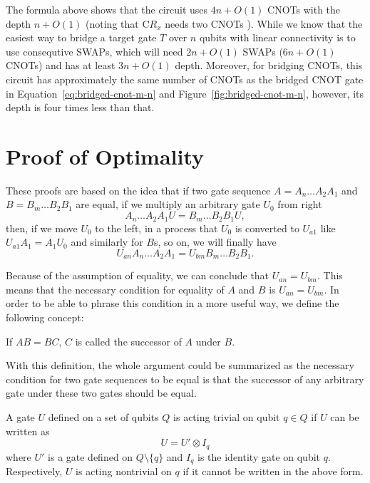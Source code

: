 The formula above shows that the circuit uses $4n + O(1)$ CNOTs with the depth $n + O(1)$ (noting that $\mathrm{C}R_x$ needs two CNOTs \cite[chapter 4]{nielsen2010}). While we know that the easiest way to bridge a target gate $T$ over $n$ qubits with linear connectivity is to use consequtive SWAPs, which will need $2n + O(1)$ SWAPs ($6n + O(1)$ CNOTs) and has at least $3n + O(1)$ depth. Moreover, for bridging CNOTs, this circuit has approximately the same number of CNOTs as the bridged CNOT gate in Equation~\ref{eq:bridged-cnot-m-n} and Figure~\ref{fig:bridged-cnot-m-n}, however, its depth is four times less than that.


\section{Proof of Optimality}

These proofs are based on the idea that if two gate sequence $A = A_n \dots A_2 A_1$ and $B = B_m \dots B_2 B_1$ are equal, if we multiply an arbitrary gate $U_{0}$ from right
\begin{equation}
  A_n \dots A_2 A_1 U = B_m \dots B_2 B_1 U,
\end{equation}
then, if we move $U_{0}$ to the left, in a process that $U_0$ is converted to $U_{a1}$ like $U_{a1} A_1 = A_1 U_{0}$ and similarly for $B$s, so on, we will finally have
\begin{equation}
  U_{an} A_n \dots A_2 A_1 = U_{bm} B_m \dots B_2 B_1.
\end{equation}

Because of the assumption of equality, we can conclude that $U_{an} = U_{bm}$. This means that the necessary condition for equality of $A$ and $B$ is $U_{an} = U_{bm}$. In order to be able to phrase this condition in a more useful way, we define the following concept:

\begin{definition}[Successor]
  If $AB = BC$, $C$ is called the successor of $A$ under $B$.
\end{definition}

With this definition, the whole argument could be summarized as the necessary condition for two gate sequences to be equal is that the successor of any arbitrary gate under these two gates should be equal.

\begin{definition}
  A gate $U$ defined on a set of qubits $Q$ is acting trivial on qubit $q \in Q$ if $U$ can be written as 
  \begin{equation}
    U = U' \otimes I_q
  \end{equation}
  where $U'$ is a gate defined on $Q \setminus \{ q \}$ and $I_q$ is the identity gate on qubit $q$.
  Respectively, $U$ is acting nontrivial on $q$ if it cannot be written in the above form.
\end{definition}

